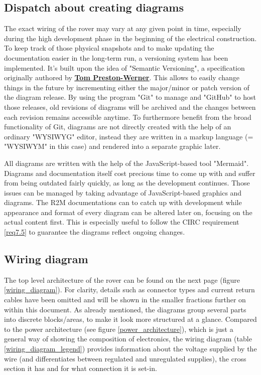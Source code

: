     \subsection{Dispatch about creating diagrams}

    The exact wiring of the rover may vary at any given point in time, especially during the high development phase in the beginning of the electrical construction. To keep track of those physical snapshots and to make updating the documentation easier in the long-term run, a versioning system has been implemented. It's built upon the idea of "Semantic Versioning", a specification originally authored by \href{https://tom.preston-werner.com/}{\textbf{\underline{Tom Preston-Werner}}}. This allows to easily change things in the future by incrementing either the major/minor or patch version of the diagram release. By using the program "Git" to manage and "GitHub" to host those releases, old revisions of diagrams will be archived and the changes between each revision remains accessible anytime. To furthermore benefit from the broad functionality of Git, diagrams are not directly created with the help of an ordinary "WYSIWYG" editor, instead they are written in a markup language (= "WYSIWYM" in this case) and rendered into a separate graphic later. 

    \vspace{5mm} %

    All diagrams are written with the help of the JavaScript-based tool "Mermaid". Diagrams and documentation itself cost precious time to come up with and suffer from being outdated fairly quickly, as long as the development continues. Those issues can be managed by taking advantage of JavaScript-based graphics and diagrams. The R2M documentations can to catch up with development while appearance and format of every diagram can be altered later on, focusing on the actual content first. This is especially useful to follow the CIRC requirement \ref{req7.5} to guarantee the diagrams reflect ongoing changes.

    \clearpage %

    \subsection{Wiring diagram}

    The top level architecture of the rover can be found on the next page (figure \ref{wiring_diagram}). For clarity, details such as connector types and current return cables have been omitted and will be shown in the smaller fractions further on within this document. As already mentioned, the diagrams group several parts into discrete blocks/areas, to make it look more structured at a glance. Compared to the power architecture (see figure \ref{power_architecture}), which is just a general way of showing the composition of electronics, the wiring diagram (table \ref{wiring_diagram_legend}) provides information about the voltage supplied by the wire (and differentiates between regulated and unregulated supplies), the cross section it has and for what connection it is set-in. 

